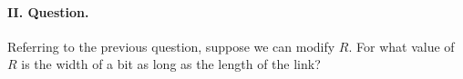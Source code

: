 
\paragraph{II. Question.}

Referring to the previous question, suppose we can modify \(R\). For
what value of \(R\) is the width of a bit as long as the length of the
link?
